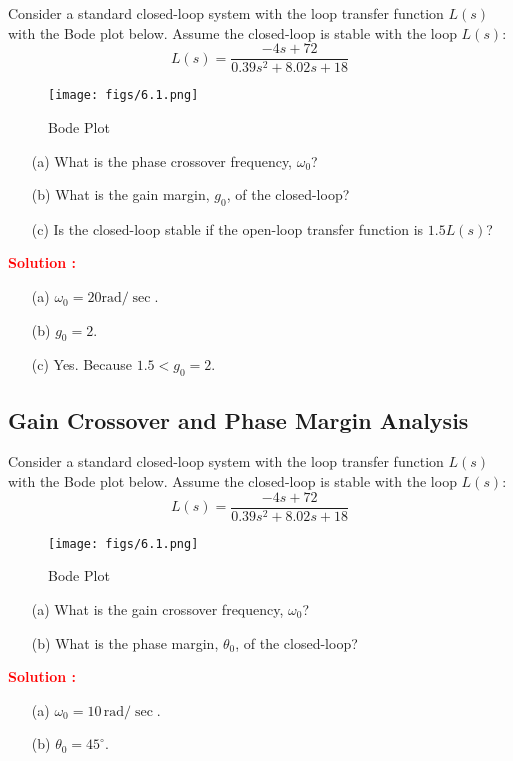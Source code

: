 \documentclass[12pt]{article}
\begin{document}
Consider a standard closed-loop system with the loop transfer function $L(s)$ with the Bode plot below.  Assume the closed-loop is stable with the loop $L(s)$:
\begin{equation*}
    L(s) = \frac{-4s+72}{0.39s^2+8.02s+18}
\end{equation*}
\begin{figure}[H]
\centering
\texttt{[image: figs/6.1.png]}
\caption{Bode Plot}
\end{figure}
\begin{itemize}
    \item[(a)] What is the phase crossover frequency, $\omega_0$?
    \item[(b)] What is the gain margin, $g_0$, of the closed-loop? 
    \item[(c)] Is the closed-loop stable if the open-loop transfer function is $1.5L(s)$?
    \end{itemize}
\textbf{\textcolor{red}{Solution :}} \\
\begin{itemize}
    \item[(a)] $\omega_0 = 20 \text{rad}/\sec.$
    \item[(b)] $g_0 = 2$.
    \item[(c)] Yes. Because $1.5 < g_0 = 2$.
\end{itemize}

\clearpage
\subsection{Gain Crossover and Phase Margin Analysis}

Consider a standard closed-loop system with the loop transfer function $L(s)$ with the Bode plot below.  Assume the closed-loop is stable with the loop $L(s)$:
\begin{equation*}
    L(s) = \frac{-4s+72}{0.39s^2+8.02s+18}
\end{equation*}
\begin{figure}[h]
\centering
\texttt{[image: figs/6.1.png]}
\caption{Bode Plot}
\end{figure}
\begin{itemize}
    \item[(a)] What is the gain crossover frequency, $\omega_0$?
    \item[(b)] What is the phase margin, $\theta_0$, of the closed-loop? 
    \end{itemize}
\textbf{\textcolor{red}{Solution :}} \\
\begin{itemize}
    \item[(a)] $\omega_0 = 10\, \text{rad}/\sec.$
    \item[(b)] $\theta_0 = 45^{\circ}$.
\end{itemize}
\clearpage
\end{document}
